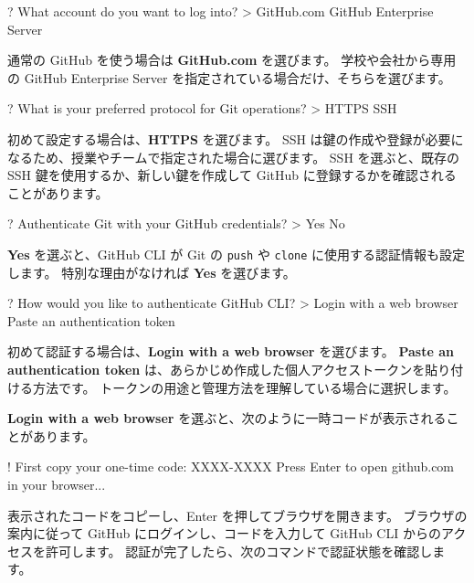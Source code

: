 \documentclass[a4paper]{jlreq}
\newcommand{\cmd}[1]{\texttt{#1}}
\newcommand{\term}[1]{\textbf{#1}}
\begin{document}
\begin{codeblock}
? What account do you want to log into?
> GitHub.com
  GitHub Enterprise Server
\end{codeblock}

通常の GitHub を使う場合は \term{GitHub.com} を選びます。
学校や会社から専用の GitHub Enterprise Server を指定されている場合だけ、そちらを選びます。

\begin{codeblock}
? What is your preferred protocol for Git operations?
> HTTPS
  SSH
\end{codeblock}

初めて設定する場合は、\term{HTTPS} を選びます。
SSH は鍵の作成や登録が必要になるため、授業やチームで指定された場合に選びます。
SSH を選ぶと、既存の SSH 鍵を使用するか、新しい鍵を作成して GitHub に登録するかを確認されることがあります。

\begin{samepage}
\begin{codeblock}
? Authenticate Git with your GitHub credentials?
> Yes
  No
\end{codeblock}
\end{samepage}

\term{Yes} を選ぶと、GitHub CLI が Git の \cmd{push} や \cmd{clone} に使用する認証情報も設定します。
特別な理由がなければ \term{Yes} を選びます。

\begin{codeblock}
? How would you like to authenticate GitHub CLI?
> Login with a web browser
  Paste an authentication token
\end{codeblock}

初めて認証する場合は、\term{Login with a web browser} を選びます。
\term{Paste an authentication token} は、あらかじめ作成した個人アクセストークンを貼り付ける方法です。
トークンの用途と管理方法を理解している場合に選択します。

\term{Login with a web browser} を選ぶと、次のように一時コードが表示されることがあります。

\begin{codeblock}
! First copy your one-time code: XXXX-XXXX
Press Enter to open github.com in your browser...
\end{codeblock}

表示されたコードをコピーし、Enter を押してブラウザを開きます。
ブラウザの案内に従って GitHub にログインし、コードを入力して GitHub CLI からのアクセスを許可します\cite{gh-auth-login}。
認証が完了したら、次のコマンドで認証状態を確認します。
\end{document}
